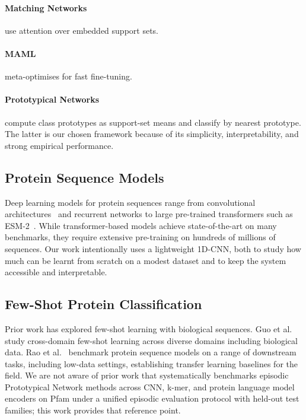 \documentclass[11pt,a4paper]{article}
\begin{document}
\paragraph{Matching Networks} \cite{vinyals2016matching} use attention over
embedded support sets.  \paragraph{MAML} \cite{finn2017model} meta-optimises for
fast fine-tuning.  \paragraph{Prototypical Networks}
\cite{snell2017prototypical} compute class prototypes as support-set means and
classify by nearest prototype.  The latter is our chosen framework because of its
simplicity, interpretability, and strong empirical performance.

\subsection{Protein Sequence Models}

Deep learning models for protein sequences range from convolutional
architectures~\cite{yang2018learned} and recurrent networks to large pre-trained
transformers such as ESM-2~\cite{lin2023evolutionary}.  While transformer-based
models achieve state-of-the-art on many benchmarks, they require extensive
pre-training on hundreds of millions of sequences.  Our work intentionally uses a
lightweight 1D-CNN, both to study how much can be learnt from scratch on a modest
dataset and to keep the system accessible and interpretable.

\subsection{Few-Shot Protein Classification}

Prior work has explored few-shot learning with biological sequences.
Guo et al.~\cite{guo2020broader} study cross-domain few-shot learning across
diverse domains including biological data.  Rao et al.~\cite{rao2019tape}
benchmark protein sequence models on a range of downstream tasks, including
low-data settings, establishing transfer learning baselines for the field.
We are not aware of prior work that systematically benchmarks episodic
Prototypical Network methods across CNN, k-mer, and protein language model
encoders on Pfam under a unified episodic evaluation protocol with held-out
test families; this work provides that reference point.
\end{document}

